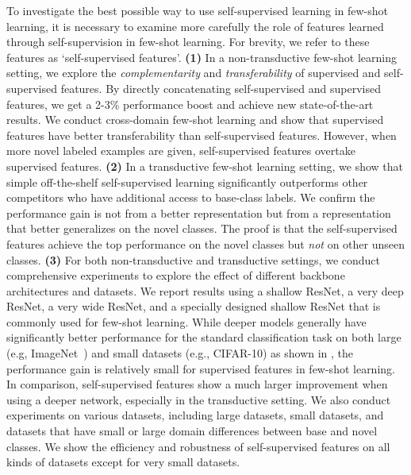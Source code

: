 \documentclass[final]{cvpr}
\begin{document}
To investigate the best possible way to use self-supervised learning in few-shot learning, it is necessary to examine more carefully the role of features learned through self-supervision in few-shot learning. For brevity, we refer to these features as `self-supervised features'. 
\textbf{(1)} In a non-transductive few-shot learning setting, we explore the \textit{complementarity} and \textit{transferability} of supervised and self-supervised features. By directly concatenating self-supervised and supervised features, we get a 2-3\% performance boost and achieve new state-of-the-art results. We conduct cross-domain few-shot learning and show that supervised features have better transferability than self-supervised features. However, when more novel labeled examples are given, self-supervised features overtake supervised features.
\textbf{(2)} In a transductive few-shot learning setting, we show that simple off-the-shelf self-supervised learning significantly outperforms other competitors who have additional access to base-class labels. 
We confirm the performance gain is not from a better representation but from a representation that better generalizes on the novel classes. The proof is that the self-supervised features achieve the top performance on the novel classes but \emph{not} on other unseen classes.
\textbf{(3)} For both non-transductive and transductive settings, we conduct comprehensive experiments to explore the effect of different backbone architectures and datasets. We report results using a shallow ResNet, a very deep ResNet, a very wide ResNet, and a specially designed shallow ResNet that is commonly used for few-shot learning. While deeper models generally have significantly better performance for the standard classification task on both large (e.g, ImageNet~\cite{deng2009imagenet}) and small datasets (e.g., CIFAR-10) as shown in \cite{he2015deep}, the performance gain is relatively small for supervised features in few-shot learning. In comparison, self-supervised features show a much larger improvement when using a deeper network, especially in the transductive setting.
We also conduct experiments on various datasets, including large datasets, small datasets, and datasets that have small or large domain differences between base and novel classes. We show the efficiency and robustness of self-supervised features on all kinds of datasets except for very small datasets. 
\end{document}
